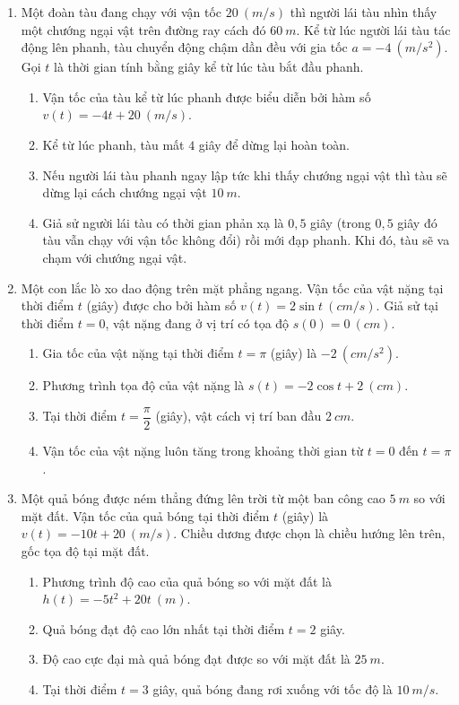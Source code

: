 \documentclass[12pt]{article}
\begin{document}
	\begin{enumerate}[label=\textbf{Câu \arabic*.}, start=1]
			
		\item Một đoàn tàu đang chạy với vận tốc $20 \ (m/s)$ thì người lái tàu nhìn thấy một chướng ngại vật trên đường ray cách đó $60 \ m$. Kể từ lúc người lái tàu tác động lên phanh, tàu chuyển động chậm dần đều với gia tốc $a = -4 \ (m/s^2)$. Gọi $t$ là thời gian tính bằng giây kể từ lúc tàu bắt đầu phanh.
		\begin{enumerate}[label=\alph*)]
			\item Vận tốc của tàu kể từ lúc phanh được biểu diễn bởi hàm số $v(t) = -4t + 20 \ (m/s)$.
			\item Kể từ lúc phanh, tàu mất $4$ giây để dừng lại hoàn toàn.
			\item Nếu người lái tàu phanh ngay lập tức khi thấy chướng ngại vật thì tàu sẽ dừng lại cách chướng ngại vật $10 \ m$.
			\item Giả sử người lái tàu có thời gian phản xạ là $0,5$ giây (trong $0,5$ giây đó tàu vẫn chạy với vận tốc không đổi) rồi mới đạp phanh. Khi đó, tàu sẽ va chạm với chướng ngại vật.
		\end{enumerate}
		
		\item Một con lắc lò xo dao động trên mặt phẳng ngang. Vận tốc của vật nặng tại thời điểm $t$ (giây) được cho bởi hàm số $v(t) = 2\sin t \ (cm/s)$. Giả sử tại thời điểm $t = 0$, vật nặng đang ở vị trí có tọa độ $s(0) = 0 \ (cm)$.
		\begin{enumerate}[label=\alph*)]
			\item Gia tốc của vật nặng tại thời điểm $t = \pi$ (giây) là $-2 \ (cm/s^2)$.
			\item Phương trình tọa độ của vật nặng là $s(t) = -2\cos t + 2 \ (cm)$.
			\item Tại thời điểm $t = \dfrac{\pi}{2}$ (giây), vật cách vị trí ban đầu $2 \ cm$.
			\item Vận tốc của vật nặng luôn tăng trong khoảng thời gian từ $t = 0$ đến $t = \pi$.
		\end{enumerate}
		
		\item Một quả bóng được ném thẳng đứng lên trời từ một ban công cao $5 \ m$ so với mặt đất. Vận tốc của quả bóng tại thời điểm $t$ (giây) là $v(t) = -10t + 20 \ (m/s)$. Chiều dương được chọn là chiều hướng lên trên, gốc tọa độ tại mặt đất.
		\begin{enumerate}[label=\alph*)]
			\item Phương trình độ cao của quả bóng so với mặt đất là $h(t) = -5t^2 + 20t \ (m)$.
			\item Quả bóng đạt độ cao lớn nhất tại thời điểm $t = 2$ giây.
			\item Độ cao cực đại mà quả bóng đạt được so với mặt đất là $25 \ m$.
			\item Tại thời điểm $t = 3$ giây, quả bóng đang rơi xuống với tốc độ là $10 \ m/s$.
		\end{enumerate}
		

\end{enumerate}
\end{document}
